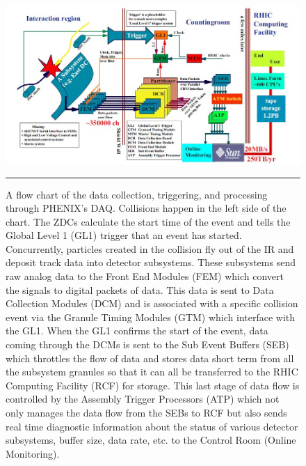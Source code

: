 \begin{figure}[h!]\captionsetup{width=1.1\linewidth}
  \centering
    \includegraphics[width=1\textwidth]{Figures/DAQ.jpg}
    \rule{35em}{0.5pt}
  \caption[A diagram of the data flow of PHENIX data through the DAQ]{A flow chart of the data collection, triggering, and processing through PHENIX's DAQ. Collisions happen in the left side of the chart. The ZDCs calculate the start time of the event and tells the Global Level 1 (GL1) trigger that an event has started. Concurrently, particles created in the collision fly out of the IR and deposit track data into detector subsystems. These subsystems send raw analog data to the Front End Modules (FEM) which convert the signals to digital packets of data. This data is sent to Data Collection Modules (DCM) and is associated with a specific collision event via the Granule Timing Modules (GTM) which interface with the GL1. When the GL1 confirms the start of the event, data coming through the DCMs is sent to the Sub Event Buffers (SEB) which throttles the flow of data and stores data short term from all the subsystem granules so that it can all be transferred to the RHIC Computing Facility (RCF) for storage. This last stage of data flow is controlled by the Assembly Trigger Processors (ATP) which not only manages the data flow from the SEBs to RCF but also sends real time diagnostic information about the status of various detector subsystems, buffer size, data rate, etc. to the Control Room (Online Monitoring).}
  \label{fig:DAQ}
\end{figure}

\pagebreak
\pagebreak
